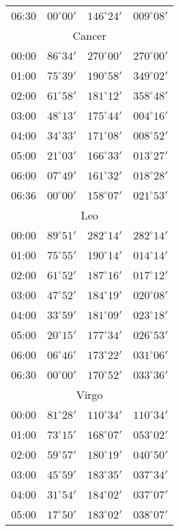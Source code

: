 \begin{table}
\begin{Parallel}{}{}
{{\begin{tabular}{l|lll}
06:30 & $00^\circ 00'$ & $146^\circ 24'$& $009^\circ 08'$ \\
\multicolumn{4}{c}{Cancer}\\
00:00 & $86^\circ 34'$ & $270^\circ 00'$& $270^\circ 00'$ \\
01:00 & $75^\circ 39'$ & $190^\circ 58'$& $349^\circ 02'$ \\
02:00 & $61^\circ 58'$ & $181^\circ 12'$& $358^\circ 48'$ \\
03:00 & $48^\circ 13'$ & $175^\circ 44'$& $004^\circ 16'$ \\
04:00 & $34^\circ 33'$ & $171^\circ 08'$& $008^\circ 52'$ \\
05:00 & $21^\circ 03'$ & $166^\circ 33'$& $013^\circ 27'$ \\
06:00 & $07^\circ 49'$ & $161^\circ 32'$& $018^\circ 28'$ \\
06:36 & $00^\circ 00'$ & $158^\circ 07'$& $021^\circ 53'$ \\
\multicolumn{4}{c}{Leo}\\
00:00 & $89^\circ 51'$ & $282^\circ 14'$& $282^\circ 14'$ \\
01:00 & $75^\circ 55'$ & $190^\circ 14'$& $014^\circ 14'$ \\
02:00 & $61^\circ 52'$ & $187^\circ 16'$& $017^\circ 12'$ \\
03:00 & $47^\circ 52'$ & $184^\circ 19'$& $020^\circ 08'$ \\
04:00 & $33^\circ 59'$ & $181^\circ 09'$& $023^\circ 18'$ \\
05:00 & $20^\circ 15'$ & $177^\circ 34'$& $026^\circ 53'$ \\
06:00 & $06^\circ 46'$ & $173^\circ 22'$& $031^\circ 06'$ \\
06:30 & $00^\circ 00'$ & $170^\circ 52'$& $033^\circ 36'$ \\
\multicolumn{4}{c}{Virgo}\\
00:00 & $81^\circ 28'$ & $110^\circ 34'$& $110^\circ 34'$ \\
01:00 & $73^\circ 15'$ & $168^\circ 07'$& $053^\circ 02'$ \\
02:00 & $59^\circ 57'$ & $180^\circ 19'$& $040^\circ 50'$ \\
03:00 & $45^\circ 59'$ & $183^\circ 35'$& $037^\circ 34'$ \\
04:00 & $31^\circ 54'$ & $184^\circ 02'$& $037^\circ 07'$ \\
05:00 & $17^\circ 50'$ & $183^\circ 02'$& $038^\circ 07'$ \\
\end{tabular}
}}
\ParallelRText{{\small
}}
\end{Parallel}
\end{table}
